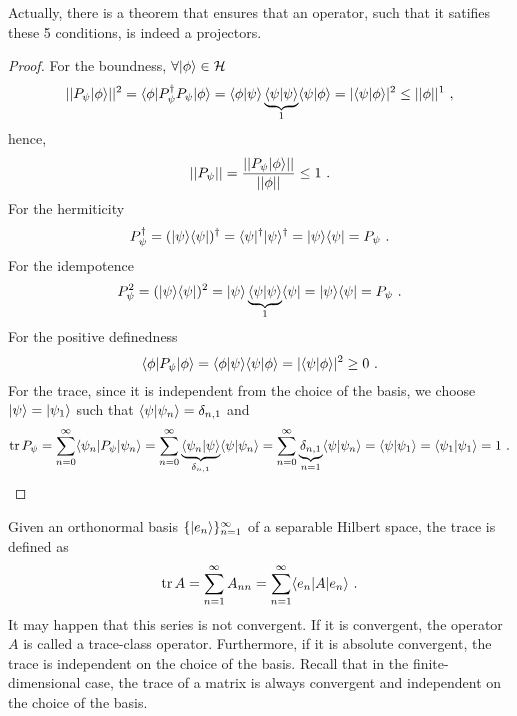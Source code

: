     Actually, there is a theorem that ensures that an operator, such that it satifies these 5 conditions, is indeed a projectors.
    \begin{proof}
        For the boundness, $\forall \vert\phi\rangle \in \mathcal H$
        \begin{equation*}
            ||P_\psi \vert\phi\rangle||^2 = \langle\phi\vert P_\psi^\dagger P_\psi \vert\phi\rangle = \langle\phi\vert\psi\rangle \underbrace{\langle\psi\vert\psi\rangle}_1 \langle\psi\vert\phi\rangle = |\langle\psi\vert\phi\rangle|^2 \leq ||\phi||^1 ~,
        \end{equation*}
        hence,
        \begin{equation*}
            ||P_\psi|| = \frac{||P_\psi \vert\phi\rangle||}{||\phi||} \leq 1 ~.
        \end{equation*}
        For the hermiticity
        \begin{equation*}
            P_\psi^\dagger = (\vert\psi\rangle \langle\psi\vert)^\dagger = \langle\psi\vert^\dagger \vert\psi\rangle^\dagger = \vert\psi\rangle \langle\psi\vert = P_\psi ~.
        \end{equation*}
        For the idempotence
        \begin{equation*}
            P_\psi^2 = (\vert\psi\rangle \langle\psi\vert)^2 = \vert\psi\rangle \underbrace{\langle\psi\vert\psi\rangle}_1 \langle\psi\vert = \vert\psi\rangle \langle\psi\vert = P_\psi ~.
        \end{equation*}
        For the positive definedness 
        \begin{equation*}
            \langle\phi\vert P_\psi \vert\phi\rangle = \langle\phi\vert\psi\rangle \langle\psi\vert\phi\rangle = |\langle\psi\vert\phi\rangle|^2 \geq 0 ~.
        \end{equation*}
        For the trace, since it is independent from the choice of the basis, we choose $\vert\psi\rangle = \vert\psi_1\rangle$ such that $\langle\psi\vert\psi_n\rangle = \delta_{n,1}$ and 
        \begin{equation*}
            \operatorname{tr} P_\psi = \sum_{n=0}^{\infty} \langle\psi_n\vert P_\psi \vert\psi_n\rangle = \sum_{n=0}^{\infty} \underbrace{\langle\psi_n\vert\psi\rangle}_{\delta_{n,1}} \langle\psi\vert\psi_n\rangle = \sum_{n=0}^{\infty} \underbrace{\delta_{n,1}}_{n=1} \langle\psi\vert\psi_n\rangle = \langle\psi\vert\psi_1\rangle = \langle\psi_1\vert\psi_1\rangle = 1 ~.
        \end{equation*}
    \end{proof}

    Given an orthonormal basis $\{\vert e_n\rangle\}_{n=1}^\infty$ of a separable Hilbert space, the trace is defined as 
    \begin{equation*}
        \operatorname{tr} A = \sum_{n=1}^\infty A_{nn} = \sum_{n=1}^\infty \langle e_n\vert A \vert e_n\rangle ~.
    \end{equation*}
    It may happen that this series is not convergent. If it is convergent, the operator $A$ is called a trace-class operator. Furthermore, if it is absolute convergent, the trace is independent on the choice of the basis. Recall that in the finite-dimensional case, the trace of a matrix is always convergent and independent on the choice of the basis.

